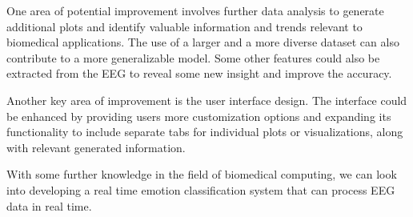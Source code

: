 \documentclass[12pt, a4paper]{report}
\begin{document}
One area of potential improvement involves further data analysis to generate additional plots and identify valuable information and trends relevant to biomedical applications. The use of a larger and a more diverse dataset can also contribute to a more generalizable model. Some other features could also be extracted from the EEG to reveal some new insight and improve the accuracy.

Another key area of improvement is the user interface design. The interface could be enhanced by providing users more customization options and expanding its functionality to include separate tabs for individual plots or visualizations, along with relevant generated information.

With some further knowledge in the field of biomedical computing, we can look into developing a real time emotion classification system that can process EEG data in real time.
\end{document}
